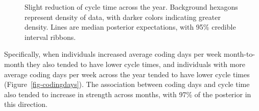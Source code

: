 \documentclass[manuscript,screen,review]{acmart}
\begin{document}
\begin{figure}


\caption[Slight reduction of cycle time across the
year]{\label{fig-month}Slight reduction of cycle time across the year.
Background hexagons represent density of data, with darker colors
indicating greater density. Lines are median posterior expectations,
with 95\% credible interval ribbons.}

\end{figure}%

Specifically, when individuals increased average coding days per week
month-to-month they also tended to have lower cycle times, and
individuals with more average coding days per week across the year
tended to have lower cycle times (Figure~\ref{fig-codingdays}). The
association between coding days and cycle time also tended to increase
in strength across months, with 97\% of the posterior in this direction.
\end{document}
